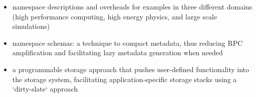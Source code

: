 \begin{itemize}

  \item namespace descriptions and overheads for examples in three different
domains (high performance computing, high energy physics, and large scale
simulations)

  \item namespace schemas: a technique to compact metadata, thus reducing RPC
amplification and facilitating lazy metadata generation when needed

  \item a programmable storage approach that pushes user-defined functionality
into the storage system, facilitating application-specific storage stacks using
a `dirty-slate` approach

\end{itemize}
